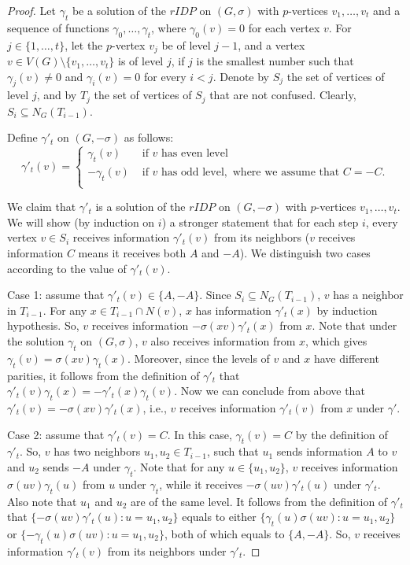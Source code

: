 \documentclass[a4paper,11pt]{article}
\theoremstyle{remark}
\begin{document}
\begin{proof}
Let $\gamma_t$ be a solution of the $rIDP$ on $(G,\sigma)$
with $p$-vertices $v_1, \dots , v_t$ and a sequence of
functions $\gamma_0, \dots ,\gamma_t$, where
$\gamma_0(v)=0$ for each vertex $v$.
For $j \in \{1, \dots,t\}$, let the $p$-vertex $v_j$ be of level $j-1$, and a vertex $v\in V(G)\setminus\{v_1,\ldots,v_t\}$ is of level $j$, if $j$ is the smallest number such that $\gamma_j(v) \not = 0$ 
and $\gamma_i(v) = 0$ for every $i<j$.
Denote by $S_j$ the set of vertices of level $j$, and by $T_j$ the set of vertices of $S_j$ that are not confused. Clearly, $S_i\subseteq N_G(T_{i-1})$.

Define $\gamma'_t$ on $(G,-\sigma)$ as follows: 
$$   \gamma'_t(v) =  
 \begin{cases}
	\gamma_t(v) & \text{ if } v \text{ has even level }\\
    - \gamma_t(v) & \text{ if } v \text{ has odd level}, \text{ where we assume that } C=-C.\\
\end{cases}
$$


We claim that $\gamma'_t$ is a solution of the $rIDP$ on $(G,-\sigma)$
with $p$-vertices $v_1, \dots, v_t$.
We will show (by induction on $i$) a stronger statement that for each step $i$, every vertex $v\in S_i$ receives information $\gamma'_t(v)$ from its neighbors ($v$ 
receives information $C$ means it receives both $A$ and $-A$). 
We distinguish two cases according to the value of $\gamma'_t(v)$.

Case 1: assume that $\gamma'_t(v)\in \{A,-A\}$.
Since $S_i\subseteq N_G(T_{i-1})$, $v$ has a neighbor in $T_{i-1}$. For any $x\in T_{i-1}\cap N(v)$, $x$ has information $\gamma'_t(x)$ by induction hypothesis. 
So, $v$ receives information $-\sigma(xv)\gamma'_t(x)$ from $x$.
Note that under the solution $\gamma_t$ on $(G,\sigma)$, $v$ also receives information from $x$, which gives $\gamma_t(v)=\sigma(xv)\gamma_t(x)$. Moreover, 
since the levels of $v$ and $x$ have different parities, it follows from the definition of $\gamma'_t$ that $\gamma'_t(v)\gamma_t(x)=-\gamma'_t(x)\gamma_t(v)$.
Now we can conclude from above that $\gamma'_t(v)=-\sigma(xv)\gamma'_t(x)$, i.e., 
$v$ receives information $\gamma'_t(v)$ from $x$ under $\gamma'$.

Case 2: assume that $\gamma'_t(v)=C$. In this case, $\gamma_t(v)=C$ by the definition of $\gamma'_t$.
So, $v$ has two neighbors $u_1,u_2\in T_{i-1}$, such that $u_1$ sends information $A$ to $v$ and $u_2$ sends $-A$ under $\gamma_t$.
Note that for any $u\in\{u_1,u_2\}$, $v$ receives information $\sigma(uv)\gamma_t(u)$ from $u$ under $\gamma_t$, while it receives $-\sigma(uv)\gamma'_t(u)$ under $\gamma'_t$. Also note that $u_1$ and $u_2$ are of the same level. It follows from the definition of $\gamma'_t$ that $\{-\sigma(uv)\gamma'_t(u)\colon u=u_1,u_2\}$ equals to either 
$\{\gamma_t(u)\sigma(uv)\colon u=u_1,u_2\}$ or $\{-\gamma_t(u)\sigma(uv)\colon u=u_1,u_2\}$, both of which equals to $\{A,-A\}$.
So, $v$ receives information $\gamma'_t(v)$ from its neighbors under $\gamma'_t$.


\end{proof}
\end{document}
